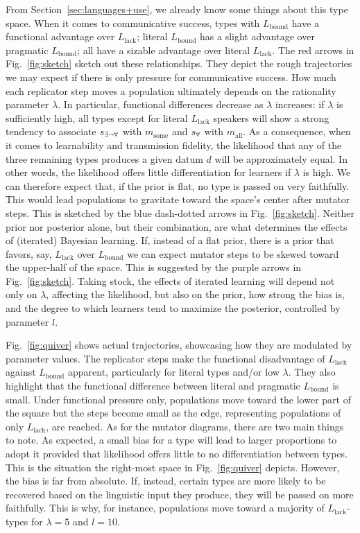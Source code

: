 \documentclass[a4paper, 11pt]{article}
\theoremstyle{Satz}
\newcommand{\state}{\ensuremath{s}\xspace}		%
\newcommand{\mystate}[1]{\ensuremath{\state_{\text{#1}}}\xspace} %
\newcommand{\mylang}[1]{\ensuremath{L_{\text{#1}}}\xspace} %
\newcommand{\messg}{\ensuremath{m}\xspace}		%
\newcommand{\mymessg}[1]{\ensuremath{\messg_{\text{#1}}}\xspace} %
\newcommand{\ssome}{\mystate{\ensuremath{\exists\neg\forall}}}
\newcommand{\sall}{\mystate{\ensuremath{\forall}}}
\newcommand{\msome}{\mymessg{some}}
\newcommand{\mall}{\mymessg{all}}
\newcommand{\Lbound}{\mylang{bound}}
\newcommand{\Llack}{\mylang{lack}}
\begin{document}
From Section~\ref{sec:languages+use}, we already know some things about this type space. When it comes to communicative success, types with $\Lbound$ have a functional advantage over $\Llack$; literal $\Lbound$ has a slight advantage over pragmatic $\Lbound$; all have a sizable advantage over literal $\Llack$. The red arrows in Fig.~\ref{fig:sketch} sketch out these relationships. They depict the rough trajectories we may expect if there is only pressure for communicative success. How much each replicator step moves a population ultimately depends on the rationality parameter $\lambda$. In particular, functional differences decrease as $\lambda$ increases: if $\lambda$ is sufficiently high, all types except for literal $\Llack$ speakers will show a strong tendency to associate $\ssome$ with $\msome$ and $\sall$ with $\mall$. As a consequence, when it comes to learnability and transmission fidelity, the likelihood that any of the three remaining types produces a given datum $d$ will be approximately equal. In other words, the likelihood offers little differentiation for learners if $\lambda$ is high. We can therefore expect that, if the prior is flat, no type is passed on very faithfully. This would lead populations to gravitate toward the space's center after mutator steps. This is sketched by the blue dash-dotted arrows in Fig.~\ref{fig:sketch}. Neither prior nor posterior alone, but their combination, are what determines the effects of (iterated) Bayesian learning. If, instead of a flat prior, there is a prior that favors, say, $\Llack$ over $\Lbound$ we can expect mutator steps to be skewed toward the upper-half of the space. This is suggested by the purple arrows in Fig.~\ref{fig:sketch}. Taking stock, the effects of iterated learning will depend not only on $\lambda$, affecting the likelihood, but also on the prior, how strong the bias is, and the degree to which learners tend to maximize the posterior, controlled by parameter $l$. 

Fig.~\ref{fig:quiver} shows actual trajectories, showcasing how they are modulated by parameter values. The replicator steps make the functional disadvantage of $\Llack$ against $\Lbound$ apparent, particularly for literal types and/or low $\lambda$. They also highlight that the functional difference between literal and pragmatic $\Lbound$ is small. Under functional pressure only, populations move toward the lower part of the square but the steps become small as the edge, representing populations of only $\Llack$, are reached. As for the mutator diagrams, there are two main things to note. As expected, a small bias for a type will lead to larger proportions to adopt it provided that likelihood offers little to no differentiation between types. This is the situation the right-most space in Fig.~\ref{fig:quiver} depicts. However, the bias is far from absolute. If, instead, certain types are more likely to be recovered based on the linguistic input they produce, they will be passed on more faithfully. This is why, for instance, populations move toward a majority of $\Llack$-types for $\lambda = 5$ and $l = 10$.
\end{document}
